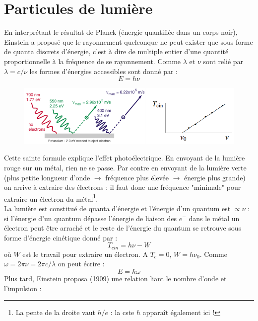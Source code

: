 \documentclass	[11pt, a4paper, openany]{book}
\begin{document}
	\section{Particules de lumière}
	En interprétant le résultat de Planck (énergie quantifiée dans un corps noir), Einstein a proposé que le rayonnement quelconque ne peut exister que sous forme de quanta discrets d'énergie, c'est à dire de multiple entier d'une quantité proportionnelle à la fréquence de se rayonnement. Comme $\lambda$ et $\nu$ sont relié par $\lambda = c/\nu$ les formes d'énergies accessibles sont donné par :
	\begin{equation}
		E = h\nu
	\end{equation}
	\begin{figure}
		\includegraphics[scale=0.3]{img/image1.png}
	\end{figure}
	Cette sainte formule explique l'effet photoélectrique. En envoyant de la lumière rouge sur un métal, rien ne se passe. Par contre en envoyant de la lumière verte (plus petite longueur d'onde $\rightarrow$ fréquence plus élevée $\rightarrow$ énergie plus grande) on arrive à extraire des électrons : il faut donc une fréquence "minimale" pour extraire un électron du métal\footnote{La pente de la droite vaut $h/e$ : la cste $h$ apparaît également ici !}.\\
	La lumière est constitué de quanta d'énergie et l'énergie d'un quantum est $\propto \nu$ : si l'énergie d'un quantum dépasse l'énergie de liaison des $e^-$ dans le métal un électron peut être arraché et le reste de l'énergie du quantum se retrouve sous forme d'énergie cinétique donné par :
	\begin{equation}
		T_{cin} = h\nu - W
	\end{equation}
	où $W$ est le travail pour extraire un électron. A $T_c = 0$, $W = h\nu_0$. Comme $\omega = 2\pi \nu = 2\pi c /\lambda$ on peut écrire :
	\begin{equation}\label{eq:ehbaromega}
		E = \hbar \omega
	\end{equation}
	Plus tard, Einstein proposa (1909) une relation liant le nombre d'onde et l'impulsion :
\end{document}
